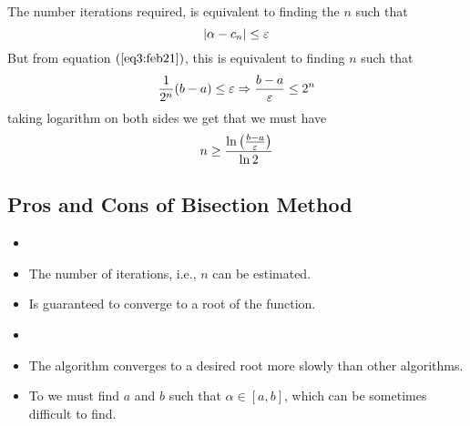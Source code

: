 The number iterations required, is equivalent to finding the $n$ such that 
\[
    |\alpha - c_n| \leq \varepsilon    
\]
But from equation $(\ref{eq3:feb21})$, this is equivalent to finding $n$ such that 
\[
    \frac{1}{2^n}(b-a) \leq \varepsilon \Rightarrow \frac{b-a}{\varepsilon} \leq 2^n
\]  
taking logarithm on both sides we get that we must have 
\begin{equation}\label{eq4:feb21}
    n \geq \frac{\ln{\left( \frac{b-a}{\varepsilon} \right)}}{\ln{2}}
\end{equation}

\subsection{Pros and Cons of Bisection Method}

\begin{tcolorbox}[
    colback = green!5,
    colframe = green!75
]
\begin{itemize}
    \item[\texty{Pros:}]
    \item The number of iterations, i.e., $n$ can be estimated.
    \item Is guaranteed to converge to a root of the function.
\end{itemize}
\end{tcolorbox}

\begin{tcolorbox}[
    colback = red!5,
    colframe = red!75
]
    \begin{itemize}
        \item[\texty{Cons:}]
        \item The algorithm converges to a desired root more slowly than other algorithms.
        \item To we must find $a$ and $b$ such that $\alpha \in [a,b]$, which can be sometimes difficult to find.
    \end{itemize}    
\end{tcolorbox}